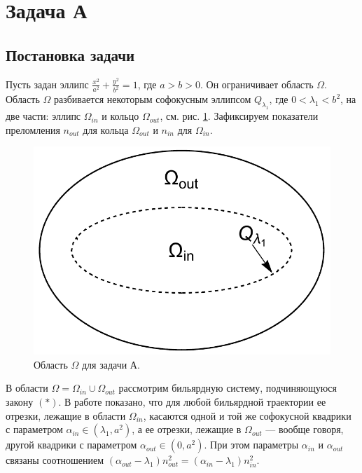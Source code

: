 \section{Задача А}\label{s2}
\subsection{Постановка задачи}\label{s2.1}
Пусть задан эллипс $\frac{x^2}{a^2} + \frac{y^2}{b^2} =1$, где $a > b>0$. 
Он ограничивает область $\Omega$.
Область $\Omega$ разбивается некоторым софокусным эллипсом $Q_{\lambda_1}$, где $0 < \lambda_1 < b^2$, на две части: эллипс $\Omega_{in}$ и кольцо $\Omega_{out}$, см. рис. \ref{fig:pt9:_problemA}. Зафиксируем показатели преломления $n_{out}$ для кольца $\Omega_{out}$ и $n_{in}$ для $\Omega_{in}$.

\begin{figure}[!htb]
\centering
\includegraphics[scale=0.4]{images/section2/domain_problemA.pdf}
    \caption{Область $\Omega$ для задачи А.}
    \label{fig:pt9:_problemA}
\end{figure}

В области $\Omega = \Omega_{in} \cup \Omega_{out}$ рассмотрим бильярдную систему, подчиняющуюся закону $(\ast)$. В работе \cite{vestnikLatest} показано, что для любой бильярдной траектории ее отрезки, лежащие в области $\Omega_{in}$, касаются одной и той же  софокусной квадрики с параметром $\alpha_{in} \in (\lambda_1, a^2)$, а ее отрезки, лежащие в $\Omega_{out}$ --- вообще говоря, другой квадрики с параметром $\alpha_{out} \in (0, a^2)$. При этом параметры $\alpha_{in}$ и $\alpha_{out}$ связаны соотношением $(\alpha_{out} - \lambda_1) n_{out}^2 = (\alpha_{in} - \lambda_1) n_{in}^2$.

